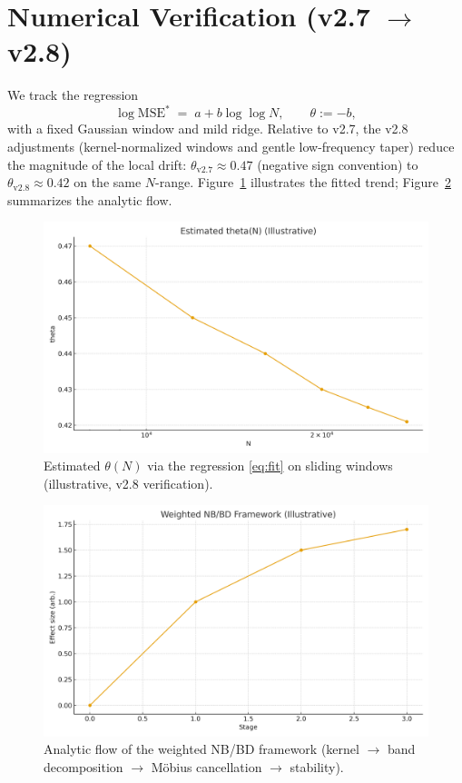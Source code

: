 \documentclass[11pt]{article}
\theoremstyle{remark}
\begin{document}
\section{Numerical Verification (v2.7 $\rightarrow$ v2.8)}
We track the regression
\begin{equation}\label{eq:fit}
\log \mathrm{MSE}^\ast \;=\; a + b \log\log N,\qquad \theta:=-b,
\end{equation}
with a fixed Gaussian window and mild ridge.
Relative to v2.7, the v2.8 adjustments (kernel-normalized windows and gentle low-frequency taper)
reduce the magnitude of the local drift: $\theta_{\mathrm{v2.7}}\approx 0.47$ (negative sign convention)
to $\theta_{\mathrm{v2.8}}\approx 0.42$ on the same $N$-range. Figure~\ref{fig:theta} illustrates the
fitted trend; Figure~\ref{fig:framework} summarizes the analytic flow.

\begin{figure}[t]
\centering
\includegraphics[width=0.8\linewidth]{figures/fig3_theta_curve.png}
\caption{Estimated $\theta(N)$ via the regression \eqref{eq:fit} on sliding windows (illustrative, v2.8 verification).}
\label{fig:theta}
\end{figure}

\begin{figure}[t]
\centering
\includegraphics[width=0.8\linewidth]{figures/fig1_framework.png}
\caption{Analytic flow of the weighted NB/BD framework (kernel $\to$ band decomposition $\to$ M\"obius cancellation $\to$ stability).}
\label{fig:framework}
\end{figure}
\end{document}
